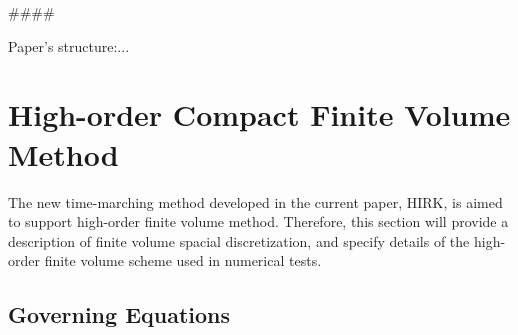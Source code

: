 \documentclass[preprint,12pt]{elsarticle}
\begin{document}
\#\#\#\#

Paper's structure:...%

\section{High-order Compact Finite Volume Method}
\label{sec:CFV}

\newcommand{\U}{\mathbf{U}}
\newcommand{\F}{\mathbf{F}}
\newcommand{\x}{\mathbf{x}}

The new time-marching method developed in
the current paper, HIRK, is aimed to support
high-order finite volume method.
Therefore,
this section will provide a description of
finite volume spacial discretization,
and specify details
of the high-order finite volume scheme
used in numerical tests.

\subsection{Governing Equations}
\label{ssec:GovEq}
\end{document}
